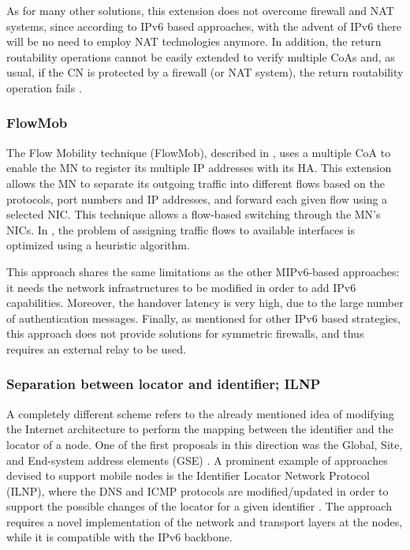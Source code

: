 \documentclass[preprint,12pt]{elsarticle}
\begin{document}
As for many other solutions, this extension does not overcome
firewall and NAT systems, since according to IPv6 based approaches, with the 
advent of IPv6 there will be no need to employ NAT technologies anymore. 
In addition, the return routability operations cannot be easily extended to 
verify multiple  \acp{CoA} and, as usual, if the CN is protected by a firewall 
(or NAT system), the return routability operation fails \cite{Chen2010407}.

\subsubsection{FlowMob}
The Flow Mobility technique (FlowMob), described in \cite{Toseef:2008}, uses a 
multiple \ac{CoA} to enable the MN to register its multiple IP addresses with its 
\ac{HA}. 
This extension allows the MN to separate its outgoing traffic into different flows 
based on the protocols, port numbers and IP addresses, and forward each given 
flow using a selected NIC. 
This technique allows a flow-based switching through the MN’s NICs. In 
\cite{ZafeirisG11}, the problem of assigning traffic flows to available 
interfaces is optimized using a heuristic algorithm. 

This approach shares the same limitations as the other MIPv6-based approaches: 
it needs the network infrastructures to be modified in order to add IPv6 
capabilities. Moreover, the handover latency is very high, due to the 
large number of authentication messages. 
Finally, as mentioned for other IPv6 based strategies, this approach does not 
provide solutions for symmetric firewalls, and thus requires an external relay 
to be used.

\subsubsection{Separation between locator and identifier; ILNP}
A completely different scheme refers to the already mentioned idea of modifying 
the Internet architecture to perform the mapping between the identifier and the 
locator of a node. One of the first proposals in this direction was the Global, 
Site, and End-system address elements (GSE) \cite{draft-ipng-gseaddr-00.txt}.
A prominent example of approaches devised to support mobile nodes is 
the Identifier Locator Network Protocol (ILNP), where the DNS and ICMP protocols 
are modified/updated in order to support the possible changes of the locator 
for a given identifier \cite{rfc6740}. 
The approach requires a novel implementation of the network and transport layers 
at the nodes, while it is compatible with the IPv6 backbone. 
\end{document}
